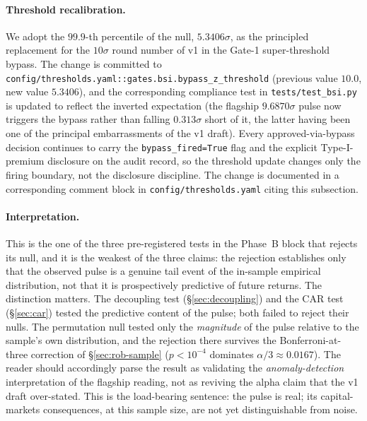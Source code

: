 \documentclass[11pt,letterpaper]{article}
\begin{document}
\paragraph{Threshold recalibration.}
We adopt the $99.9$-th percentile of the null, $5.3406\sigma$, as the
principled replacement for the $10\sigma$ round number of v1 in the
Gate-1 super-threshold bypass. The change is committed to
\texttt{config/thresholds.yaml::gates.bsi.bypass\_z\_threshold}
(previous value $10.0$, new value $5.3406$), and the corresponding
compliance test in \texttt{tests/test\_bsi.py} is updated to reflect
the inverted expectation (the flagship $9.6870\sigma$ pulse now
triggers the bypass rather than falling $0.313\sigma$ short of it,
the latter having been one of the principal embarrassments of the
v1 draft). Every approved-via-bypass decision continues to carry the
\texttt{bypass\_fired=True} flag and the explicit
Type-I-premium disclosure on the audit record, so the threshold
update changes only the firing boundary, not the disclosure
discipline. The change is documented in a corresponding comment
block in \texttt{config/thresholds.yaml} citing this subsection.

\paragraph{Interpretation.}
This is the one of the three pre-registered tests in the Phase~B
block that rejects its null, and it is the weakest of the three
claims: the rejection establishes only that the observed pulse is a
genuine tail event of the in-sample empirical distribution, not that
it is prospectively predictive of future returns. The distinction
matters. The decoupling test (\S\ref{sec:decoupling}) and the CAR
test (\S\ref{sec:car}) tested the predictive content of the pulse;
both failed to reject their nulls. The permutation null tested only
the \emph{magnitude} of the pulse relative to the sample's own
distribution, and the rejection there survives the Bonferroni-at-
three correction of \S\ref{sec:rob-sample} ($p < 10^{-4}$ dominates
$\alpha/3 \approx 0.0167$). The reader should accordingly parse the
result as validating the \emph{anomaly-detection} interpretation of
the flagship reading, not as reviving the alpha claim that the v1
draft over-stated. This is the load-bearing sentence: the pulse is
real; its capital-markets consequences, at this sample size, are not
yet distinguishable from noise.
\end{document}
